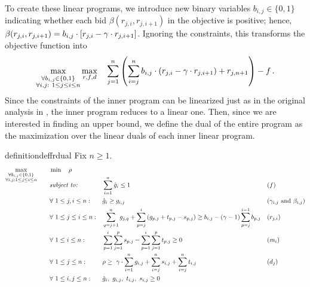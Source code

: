 To create these linear programs, we introduce new binary variables $b_{i,j} \in \{0, 1\}$ indicating whether each bid $\beta(r_{j,i}, r_{j,i+1})$ in the objective is positive; hence, $\beta(r_{j,i}, r_{j,i+1})=b_{i,j} \cdot [r_{j,i} - \gamma \cdot r_{j,i+1}] $.
Ignoring the constraints, this transforms the objective function into
\begin{equation*}
    \max_{\substack{\\ \forall b_{i,j}\in\{0,1\} \\ \forall i,j:\  1\leq j\leq i \leq n}} \max_{r,f,d} \quad 
            \sum_{j=1}^{n} \left(\sum_{i=j}^{n} b_{i,j} \cdot (r_{j,i} -\gamma \cdot r_{j,i+1})  + r_{j,n+1}\right) - f\,.
\end{equation*}
Since the constraints of the inner program can be linearized just as in the original analysis in \cite{JMS02,JainMMSV03}, the inner program reduces to a linear one. Then, since we are interested in finding an upper bound, we define the dual of the entire program as the maximization over the linear duals of each inner linear program.
\begin{restatable}{definition}{deffrdual}
\label{def:frdual}
    Fix $n\geq 1$.
    \begin{align*}
    \smash{\max_{\substack{\forall b_{i,j}\in\{0,1\} \\ \forall i,j: 1\leq j\leq i \leq n}}}\qquad 
    & \min \quad \rho \\
    &\begin{aligned}
        &\text{\emph{subject to:}} 
        &&  \sum_{i=1}^{n} \hat{g}_i \leq 1 && \text{($f$)} \\
        & \forall \ 1 \le j, i \le n: 
        && \hat{g}_i \geq g_{i,j} && \text{($\gamma_{i,j}$ and $\beta_{i,j}$)}\\
        & \forall \ 1\le j \le i \le n: 
        && \sum_{q=j+1}^n g_{j,q} + \sum_{p = j}^{i} \left(g_{p,j} + t_{p,j} - s_{p,j}\right) \geq b_{i,j} - (\Mcoeff-1) \sum_{p=j}^{i-1} b_{p,j}
        && \text{($r_{j,i}$)}\\
        & \forall \ 1\leq i \leq n: 
        &&\sum_{p=1}^i \sum_{j=1}^p s_{p,j} - \sum_{p=1}^i \sum_{j=1}^p t_{p,j} \ge 0 && \text{($m_i$)}\\
        & \forall \ 1\leq j\leq n:
        && \rho \geq \ \Mcoeff\cdot \sum_{i=1}^n g_{i,j} + \sum_{i=j}^n s_{i,j} + \sum_{i=j}^n t_{i,j} && \text{($d_j$)} \\
        & \forall \ 1 \le i,j \le n: && \hat{g}_{i}, \ g_{i,j}, \ t_{i,j}, \ s_{i,j} \geq 0
    \end{aligned}
    \end{align*}
\end{restatable}

